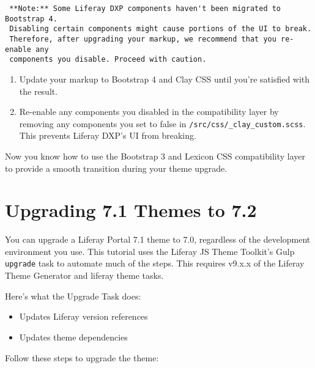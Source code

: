 \noindent\hrulefill

\begin{verbatim}
 **Note:** Some Liferay DXP components haven't been migrated to Bootstrap 4.
 Disabling certain components might cause portions of the UI to break.
 Therefore, after upgrading your markup, we recommend that you re-enable any
 components you disable. Proceed with caution.
\end{verbatim}

\noindent\hrulefill

\begin{enumerate}
\def\labelenumi{\arabic{enumi}.}
\setcounter{enumi}{2}
\item
  Update your markup to Bootstrap 4 and Clay CSS until you're satisfied
  with the result.
\item
  Re-enable any components you disabled in the compatibility layer by
  removing any components you set to false in
  \texttt{/src/css/\_clay\_custom.scss}. This prevents Liferay DXP's UI
  from breaking.
\end{enumerate}

Now you know how to use the Bootstrap 3 and Lexicon CSS compatibility
layer to provide a smooth transition during your theme upgrade.

\chapter{Upgrading 7.1 Themes to 7.2}\label{upgrading-7.1-themes-to-7.2}

You can upgrade a Liferay Portal 7.1 theme to 7.0, regardless of the
development environment you use. This tutorial uses the Liferay JS Theme
Toolkit's Gulp \texttt{upgrade} task to automate much of the steps. This
requires v9.x.x of the Liferay Theme Generator and liferay theme tasks.

Here's what the Upgrade Task does:

\begin{itemize}
\tightlist
\item
  Updates Liferay version references
\item
  Updates theme dependencies
\end{itemize}

Follow these steps to upgrade the theme:

